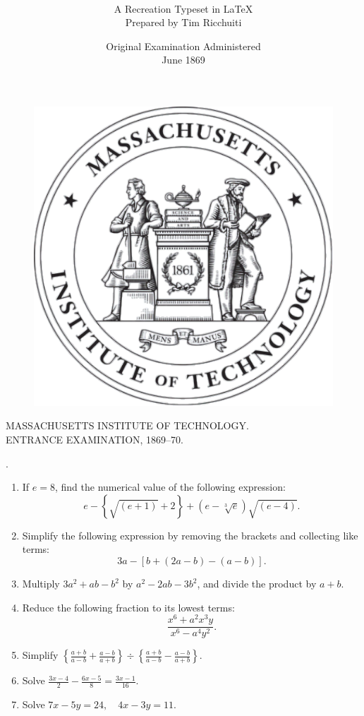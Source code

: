 \documentclass[12pt]{article}
\title{\textls[200]{\LARGE{\textbf{\uppercase{Mathematical Portions}}}} \\
       \textls[150]{\Large{\textbf{\uppercase{of the}}}} \\
       \textls[180]{\LARGE{\textbf{\uppercase{1869 MIT}}}} \\
       \textls[180]{\LARGE{\textbf{\uppercase{Entrance Examination}}}}}
\author{A Recreation Typeset in \LaTeX \\ Prepared by Tim Ricchuiti}
\date{Original Examination Administered \\ June 1869}
\begin{document}
\begin{figure}
    \centering
    \includegraphics[width=0.3\linewidth]{images/mitcrest.png}
\end{figure}
\maketitle
\thispagestyle{empty}
\newpage


\begin{center}
    \MakeUppercase{Massachusetts Institute of Technology.}\\ \vspace{12pt}
    \textsf{\MakeUppercase{\scriptsize Entrance Examination, 1869--70.}}
\end{center}

\begin{center}
    .
\end{center}

\begin{enumerate}[itemsep=18pt] %
    \item If $e = 8$, find the numerical value of the following expression:
    \[
    e - \left\{ \sqrt{(e + 1)} + 2 \right\} + \left( e - \sqrt[3]{e} \right) \sqrt{(e - 4)}.
    \]

    \item Simplify the following expression by removing the brackets and collecting like terms:
    \[
    3a - \left[ b + \left( 2a - b \right) - (a - b) \right].
    \]

    \item Multiply $3a^2 + ab - b^2$ by $a^2 - 2ab - 3b^2$, and divide the product by $a + b$.

    \item Reduce the following fraction to its lowest terms:
    \[
    \frac{x^6 + a^2x^3y}{x^6 - a^4y^2}.
    \]

    \item Simplify $\displaystyle \left\{ \frac{a + b}{a - b} + \frac{a - b}{a + b} \right\} \div \left\{ \frac{a + b}{a - b} - \frac{a - b}{a + b} \right\}$.

    \item Solve $\displaystyle \frac{3x - 4}{2} - \frac{6x - 5}{8} = \frac{3x - 1}{16}$.

    \item Solve $\displaystyle 7x - 5y = 24, \quad 4x - 3y = 11.$
\end{enumerate}
\end{document}
